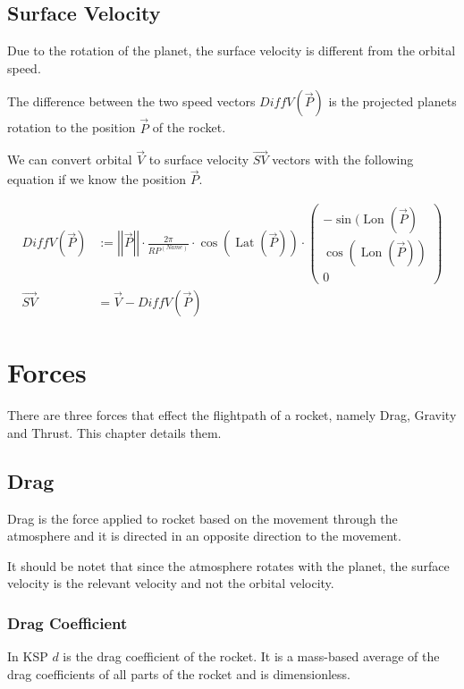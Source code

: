 \documentclass[11pt]{report}
\newcommand{\oa}[1]{\overrightarrow{#1}}
\newcommand{\Pos}{\oa{P}}
\newcommand{\Vel}{\oa{V}}
\newcommand{\absvec}[1]{\left|\left|{#1}\right|\right|}
\DeclareMathOperator{\Lat}{Lat}
\DeclareMathOperator{\Lon}{Lon}
\begin{document}
\section{Surface Velocity}

Due to the rotation of the planet, the 
surface velocity is different from the orbital speed.

The difference between the two speed vectors $DiffV(\Pos)$ is the
projected planets rotation to the position $\Pos$ of the rocket.

We can convert orbital $\Vel$ to surface velocity $\oa{SV}$
vectors with the following equation if we know the position $\Pos$.

\begin{align}
  DiffV(\Pos) &:= \absvec{\Pos} \cdot \frac{2 \pi}{RP^{(Name)}} \cdot \cos\left(\Lat\left(\Pos\right)\right)\cdot\left(\begin{smallmatrix}-\sin(\Lon(\Pos)\\\cos(\Lon(\Pos))\\0\end{smallmatrix}\right)\nonumber\\
  \oa{SV} &= \Vel - DiffV(\Pos)
\end{align}

\chapter{Forces}

There are three forces that effect the flightpath of a rocket, namely
Drag, Gravity and Thrust. This chapter details them.

\section{Drag}

 Drag is the force applied to rocket based on the movement
through the atmosphere and it is directed in an opposite direction to
the movement.

It should be notet that since the atmosphere rotates with the planet,
the surface velocity is the relevant velocity and not the orbital
velocity.

\subsection{Drag Coefficient}

In KSP $d$ is the  drag coefficient of the
rocket. It is a mass-based average of the drag coefficients of all
parts of the rocket and is dimensionless.
\end{document}
